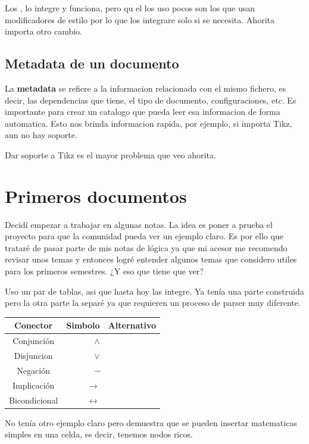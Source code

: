 \documentclass{article}
\begin{document}
  Los , lo
  integre y funciona, pero qu el los uso pocos son los que usan modificadores
  de estilo por lo que los integrare solo si se necesita. Ahorita importa otro cambio.
  
  \section{ Metadata de un documento }
  
  La {\bfseries metadata} se refiere a la informacion relacionada con el mismo fichero,
  es decir, las dependencias que tiene, el tipo de documento, configuraciones, etc. Es
  importante para crear un catalogo que pueda leer esa informacion de forma automatica.
  Esto nos brinda informacion rapida, por ejemplo, si importa Tikz, aun no hay soporte.
  
  \alert{ Dar soporte a Tikz es el mayor problema que veo ahorita. }
  
  \chapter{ Primeros documentos }
  
  Decidí empezar a trabajar en algunas notas. La idea es poner a prueba el proyecto para
  que la comunidad pueda ver un ejemplo claro. Es por ello que trataré de pasar parte de
  mis notas de lógica ya que mi acesor me recomendo revisar unos temas y entonces logré
  entender algunos temas que considero utiles para los primeros semestres. ¿Y eso que
  tiene que ver?
  
  Uso un par de tablas, asi que hasta hoy las integre. Ya tenía una parte construida pero
  la otra parte la separé ya que requieren un proceso de parser muy diferente.
  
  \begin{tabular}{ c|rr }
    Conector & Simbolo & Alternativo \\
    \hline
    Conjunción    & $ \land $ & \\
    Disjuncion    & $ \lor $ & \\
    Negación      & $ \neg $ & ~ \\
    Implicación   & $ \rightarrow $ & \\
    Bicondicional & $ \leftrightarrow $ & \\
    \hline
  \end{tabular}
  
  No tenía otro ejemplo claro pero demuestra que se pueden insertar matematicas simples
  en una celda, es decir, tenemos nodos ricos.
  
\end{document}
